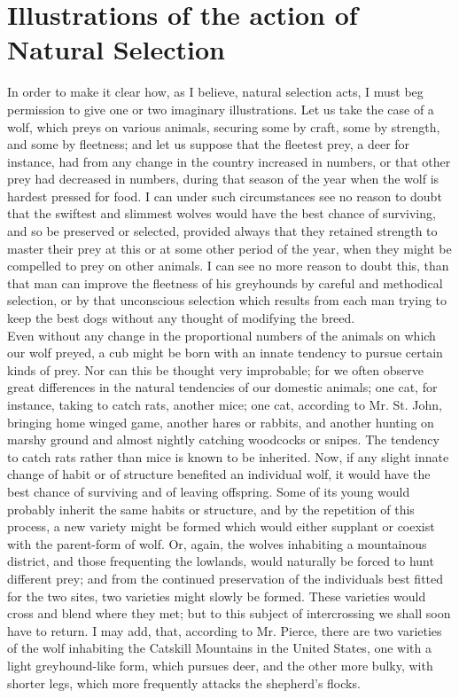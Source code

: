 \section{Illustrations of the action of Natural Selection}
\indent In order to make it clear how, as I believe, natural selection acts, I must beg permission to give one or two imaginary illustrations. Let us take the case of a wolf, which preys on various animals, securing some by craft, some by strength, and some by fleetness; and let us suppose that the fleetest prey, a deer for instance, had from any change in the country increased in numbers, or that other prey had decreased in numbers, during that season of the year when the wolf is hardest pressed for food. I can under such circumstances see no reason to doubt that the swiftest and slimmest wolves would have the best chance of surviving, and so be preserved or selected, provided always that they retained strength to master their prey at this or at some other period of the year, when they might be compelled to prey on other animals. I can see no more reason to doubt this, than that man can improve the fleetness of his greyhounds by careful and methodical selection, or by that unconscious selection which results from each man trying to keep the best dogs without any thought of modifying the breed. \\
\indent Even without any change in the proportional numbers of the animals on which our wolf preyed, a cub might be born with an innate tendency to pursue certain kinds of prey. Nor can this be thought very improbable; for we often observe great differences in the natural tendencies of our domestic animals; one cat, for instance, taking to catch rats, another mice; one cat, according to Mr.  St. John, bringing home winged game, another hares or rabbits, and another hunting on marshy ground and almost nightly catching woodcocks or snipes. The tendency to catch rats rather than mice is known to be inherited. Now, if any slight innate change of habit or of structure benefited an individual wolf, it would have the best chance of surviving and of leaving offspring. Some of its young would probably inherit the same habits or structure, and by the repetition of this process, a new variety might be formed which would either supplant or coexist with the parent-form of wolf. Or, again, the wolves inhabiting a mountainous district, and those frequenting the lowlands, would naturally be forced to hunt different prey; and from the continued preservation of the individuals best fitted for the two sites, two varieties might slowly be formed. These varieties would cross and blend where they met; but to this subject of intercrossing we shall soon have to return.  I may add, that, according to Mr. Pierce, there are two varieties of the wolf inhabiting the Catskill Mountains in the United States, one with a light greyhound-like form, which pursues deer, and the other more bulky, with shorter legs, which more frequently attacks the shepherd's flocks. \\
